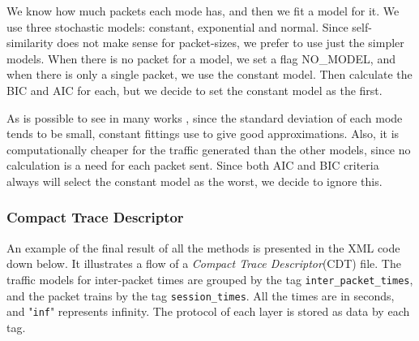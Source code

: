 We know how much packets each mode has, and then we fit a model for it. We use three stochastic models: constant, exponential and normal. Since self-similarity does not make sense for packet-sizes, we prefer to use just the simpler models. When there is no packet for a model, we set a flag NO\_MODEL, and when there is only a single packet, we use the constant model. Then calculate the BIC and AIC for each, but we decide to set the constant model as the first.

As is possible to see in many works \cite{packet-distribution-model} \cite{udp-flows-model}, since the standard deviation of each mode tends to be small, constant fittings use to give good approximations. Also, it is computationally cheaper for the traffic generated than the other models, since no calculation is a need for each packet sent. Since both AIC and BIC criteria always will select the constant model as the worst, we decide to ignore this.


\subsubsection{Compact Trace Descriptor}


An example of the final result of all the methods is presented in the XML code down below. It illustrates a flow of a \textit{Compact Trace Descriptor}(CDT) file. The traffic models for inter-packet times are grouped by the tag \texttt{inter\_packet\_times}, and the packet trains by the tag \texttt{session\_times}. All the times are in seconds, and "\texttt{inf}" represents infinity. The protocol of each layer is stored as data by each tag.

